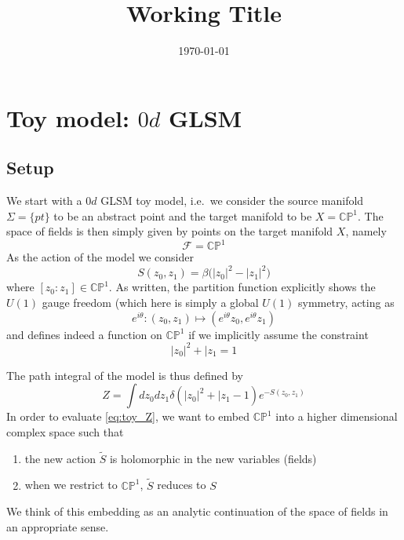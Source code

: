 \documentclass[a4paper,11pt]{article}
\title{Working Title}
\author{}
\date{\today}
\theoremstyle{definition}
\newcommand{\CP}{\mathbb{CP}}
\newcommand{\F}{\mathcal{F}}
\begin{document}
\maketitle

\tableofcontents

\section{Toy model: \texorpdfstring{$0d$ GLSM}{0d GLSM}}
\subsection{Setup}
We start with a $0d$ GLSM toy model, i.e.\ we consider the source manifold $\Sigma = \{ pt \}$ to be an abstract point and the target manifold to be $X = \CP^1$.
The space of fields is then simply given by points on the target manifold $X$, namely 
\begin{equation}
  \F = \CP^1
\end{equation}
As the action of the model we consider 
\begin{equation}
  S(z_0,z_1) = \beta \Big( \lvert z_0 \rvert^2 - \lvert z_1 \rvert^2 \Big)
  \label{eq:toy_S}
\end{equation}
where $[z_0:z_1] \in \CP^1$.
As written, the partition function explicitly shows the $U(1)$ gauge freedom (which here is simply a global $U(1)$ symmetry, acting as 
\begin{equation}
  e^{i\theta}\colon (z_0,z_1) \mapsto (e^{i\theta} z_0, e^{i\theta} z_1)
\end{equation}
and defines indeed a function on $\CP^1$ if we implicitly assume the constraint 
\begin{equation}
  \lvert z_0 \rvert^2 + \lvert z_1 = 1
  \label{eq:toy_constr}
\end{equation}

The path integral of the model is thus defined by 
\begin{equation}
Z = \int dz_0 dz_1 \delta(\lvert z_0 \rvert^2 + \lvert z_1 - 1) e^{-S(z_0,z_1)}
  \label{eq:toy_Z}
\end{equation}
In order to evaluate \eqref{eq:toy_Z}, we want to embed $\CP^1$ into a higher dimensional complex space such that 
\begin{enumerate}
  \item the new action $\tilde S$ is holomorphic in the new variables (fields)
  \item when we restrict to $\CP^1$, $\tilde S$ reduces to $S$
\end{enumerate}
We think of this embedding as an analytic continuation of the space of fields in an appropriate sense.
\end{document}
